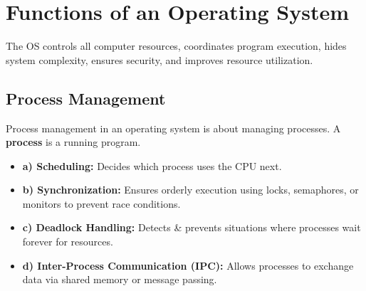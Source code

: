 \documentclass[10pt,a4paper]{article}
\begin{document}
\section{Functions of an Operating System}

The OS controls all computer resources, coordinates program execution, hides system complexity, ensures security, and improves resource utilization.

\begin{center}
\end{center}

\subsection{Process Management}
Process management in an operating system is about managing processes. A \textbf{process} is a running program.
\begin{itemize}
    \item \textbf{a) Scheduling:} Decides which process uses the CPU next.
    \item \textbf{b) Synchronization:} Ensures orderly execution using locks, semaphores, or monitors to prevent race conditions.
    \item \textbf{c) Deadlock Handling:} Detects \& prevents situations where processes wait forever for resources.
    \item \textbf{d) Inter-Process Communication (IPC):} Allows processes to exchange data via shared memory or message passing.
\end{itemize}
\end{document}
